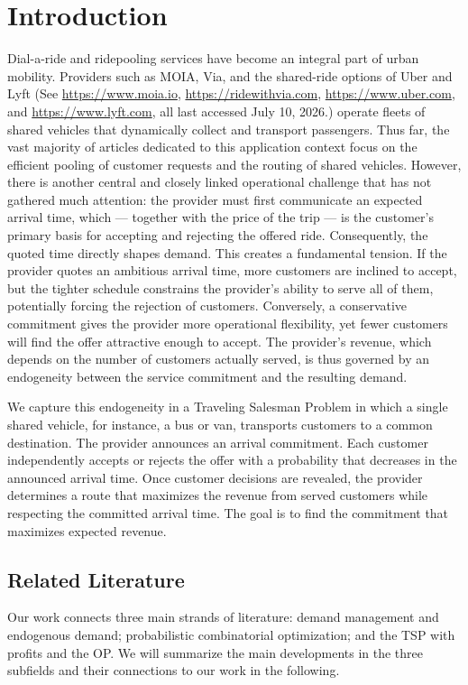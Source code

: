 \documentclass[11pt]{article}
\theoremstyle{plain}
\theoremstyle{definition}
\begin{document}
\section{Introduction}
	Dial-a-ride and ridepooling services have become an integral part of urban mobility. Providers such as MOIA, Via, and the shared-ride options of Uber and Lyft (See \url{https://www.moia.io}, \url{https://ridewithvia.com}, \url{https://www.uber.com}, and \url{https://www.lyft.com}, all last accessed July 10, 2026.) operate fleets of shared vehicles that dynamically collect and transport passengers. Thus far, the vast majority of articles dedicated to this application context focus on the efficient pooling of customer requests and the routing of shared vehicles. However, there is another central and closely linked operational challenge that has not gathered much attention: the provider must first communicate an expected arrival time, which --- together with the price of the trip --- is the customer's primary basis for accepting and rejecting the offered ride. Consequently, the quoted time directly shapes demand.
	This creates a fundamental tension. If the provider quotes an ambitious arrival time, more customers are inclined to accept, but the tighter schedule constrains the provider's ability to serve all of them, potentially forcing the rejection of customers. Conversely, a conservative commitment gives the provider more operational flexibility, yet fewer customers will find the offer attractive enough to accept. The provider's revenue, which depends on the number of customers actually served, is thus governed by an endogeneity between the service commitment and the resulting demand.
	
	We capture this endogeneity in a Traveling Salesman Problem in which a single shared vehicle, for instance, a bus or van, transports customers to a common destination. The provider announces an arrival commitment. Each customer independently accepts or rejects the offer with a probability that decreases in the announced arrival time. Once customer decisions are revealed, the provider determines a route that maximizes the revenue from served customers while respecting the committed arrival time. The goal is to find the commitment that maximizes expected revenue.
	
	\subsection{Related Literature}
	
	Our work connects three main strands of literature: demand management and endogenous demand; probabilistic combinatorial optimization; and the \ac{TSP} with profits and the \ac{OP}. We will summarize the main developments in the three subfields and their connections to our work in the following.
	
\end{document}
